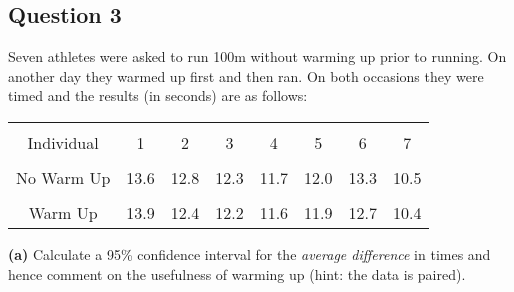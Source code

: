 \documentclass[12pt]{article}
\begin{document}
\subsection*{Question 3}
Seven athletes were asked to run 100m without warming up prior to running. On another day they warmed up first and then ran. On both occasions they were timed and the results (in seconds) are as follows:\\[-0.3cm]
\begin{center}
\begin{tabular}{|c|ccccccc|}
\hline
&&&&&&&\\[-0.3cm]
Individual & 1 & 2 & 3 & 4 & 5 & 6 & 7 \\[0.1cm]
\hline
&&&&&&&\\[-0.3cm]
No Warm Up    & 13.6 & 12.8 & 12.3 & 11.7 & 12.0 & 13.3 & 10.5 \\[0.1cm]
\hline
&&&&&&&\\[-0.3cm]
Warm Up       & 13.9 & 12.4 & 12.2 & 11.6 & 11.9 & 12.7 & 10.4 \\[0.1cm]
\hline
\end{tabular}
\end{center}

{\bf(a)} Calculate a 95\% confidence interval for the \emph{average difference} in times and hence comment on the usefulness of warming up (hint: the data is paired).
\end{document}
